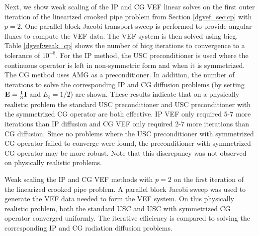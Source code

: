 \documentclass[../doc.tex]{subfiles}
\begin{document}
Next, we show weak scaling of the IP and CG VEF linear solves on the first outer iteration of the linearized crooked pipe problem from Section \ref{dgvef_sec:cp} with $p=2$. One parallel block Jacobi transport sweep is performed to provide angular fluxes to compute the VEF data. The VEF system is then solved using \gls{bicg}. Table \ref{dgvef:weak_cp} shows the number of \gls{bicg} iterations to convergence to a tolerance of $10^{-8}$. For the IP method, the USC preconditioner is used where the continuous operator is left in non-symmetric form and when it is symmetrized. The CG method uses AMG as a preconditioner. In addition, the number of iterations to solve the corresponding IP and CG diffusion problems (by setting $\boldsymbol{\mathrm{E}} = \frac{1}{3}\boldsymbol{\mathrm{I}}$ and $E_b = 1/2$) are shown. These results indicate that on a physically realistic problem the standard USC preconditioner and USC preconditioner with the symmetrized CG operator are both effective. IP VEF only required 5-7 more iterations than IP diffusion and CG VEF only required 2-7 more iterations than CG diffusion. Since no problems where the USC preconditioner with symmetrized CG operator failed to converge were found, the preconditioner with symmetrized CG operator may be more robust. Note that this discrepancy was not observed on physically realistic problems. 
\begin{table}
\centering
\caption{Weak scaling the IP and CG VEF methods with $p=2$ on the first iteration of the linearized crooked pipe problem. A parallel block Jacobi sweep was used to generate the VEF data needed to form the VEF system. On this physically realistic problem, both the standard USC and USC with symmetrized CG operator converged uniformly. The iterative efficiency is compared to solving the corresponding IP and CG radiation diffusion problems. }
\label{dgvef:weak_cp}

\end{table}
\end{document}
